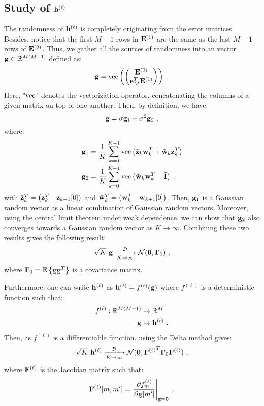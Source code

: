 \documentclass[journal, onecolumn]{IEEEtran}
\begin{document}
\subsection{Study of $\bh^{(\ell)}$}
The randomness of $\bh^{(\ell)}$ is completely originating from the error matrices. Besides, notice that the first $M-1$ rows in $\bE^{(1)}$ are the same as the last $M-1$ rows of $\bE^{(0)}$. Thus, we gather all the sources of randomness into an vector $\bg\in\RR^{M(M+1)}$ defined as:
\[
\bg = \vec\left(
\begin{pmatrix}
\bE^{(0)} \\
\be_M^T\bE^{(1)}
\end{pmatrix}
\right)\ .
\]
Here, "$\vec$" denotes the vectorization operator, concatenating the columns of a given matrix on top of one another. Then, by definition, we have:
\[
\bg = \sigma\bg_1 + \sigma^2\bg_2\ ,
\]
where:
\begin{align*}
\bg_1 &= \dfrac1K\sum_{k=0}^{K-1}\vec\left( \tilde\bz_k\bw_k^T + \tilde\bw_k\bz_k^T \right) \\
\bg_2 &= \dfrac1K\sum_{k=0}^{K-1}\vec\left(\tilde\bw_k\bw_k^T-\tilde\bI \right) \ .
\end{align*}
with $\tilde\bz_k^T= \begin{pmatrix} \bz_k^T & \bz_{k+1}[0] \end{pmatrix}$ and $\tilde\bw_k^T= \begin{pmatrix} \bw_k^T & \bw_{k+1}[0] \end{pmatrix}$. Then, $\bg_1$ is a Gaussian random vector as a linear combination of Gaussian random vectors. Moreover, using the central limit theorem under weak dependence, we can show that $\bg_2$ also converges towards a Gaussian random vector as $K\to\infty$. Combining these two results gives the following result:
\[
\sqrt{K}\ \bg \xrightarrow[K\to\infty]{\cD} \cN(\bzero,\bGamma_0)\ ,
\]
where $\bGamma_0=\EE\left\{\bg\bg^T\right\}$ is a covariance matrix.

Furthermore, one can write $\bh^{(\ell)}$ as $\bh^{(\ell)}=f^{(\ell)}(\bg)$ where $f^{(\ell)}$ is a deterministic function such that:
\begin{align*}
f^{(\ell)} : \RR^{M(M+1)} &\to \RR^{M} \\
 \bg &\mapsto \bh^{(\ell)}\ . \\
\end{align*}
Then, as $f^{(\ell)}$ is a differentiable function, using the Delta method gives:
\begin{align*}
\sqrt{K}\ \bh^{(\ell)} \xrightarrow[K\to\infty]{\cD} \cN(\bzero,{\bF^{(\ell)}}^T\bGamma_0\bF^{(\ell)})\ ,
\end{align*}
where $\bF^{(\ell)}$ is the Jacobian matrix such that:
\[
\bF^{(\ell)}[m,m'] = \left.\dfrac{\partial f^{(\ell)}_m}{\partial\bg[m']}\right\vert_{\bg=\bzero}\ .
\]
\end{document}
